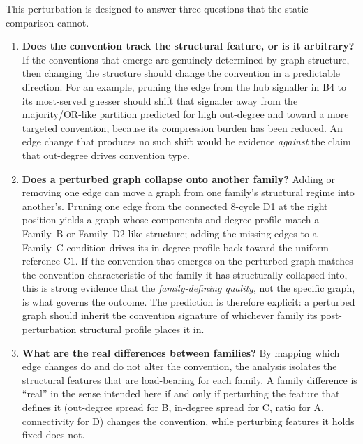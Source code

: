 \documentclass[a4paper,twoside,12pt]{report}
\begin{document}
    This perturbation is designed to answer three questions that the static
    comparison cannot.
    
    \begin{enumerate}
        \item \textbf{Does the convention track the structural feature, or is it
        arbitrary?} If the conventions that emerge are genuinely determined by
        graph structure, then changing the structure should change the convention
        in a predictable direction. For an example, pruning the edge from the hub signaller in B4 to
        its most-served guesser should shift that signaller away from the
        majority/OR-like partition predicted for high out-degree and toward a more
        targeted convention, because its compression burden has been reduced. An
        edge change that produces no such shift would be evidence \emph{against}
        the claim that out-degree drives convention type.
    
        \item \textbf{Does a perturbed graph collapse onto another family?} Adding
        or removing one edge can move a graph from one family's structural regime
        into another's. Pruning one edge from the connected $8$-cycle D1 at the
        right position yields a graph whose components and degree profile match a
        Family~B or Family~D2-like structure; adding the missing edges to a
        Family~C condition drives its in-degree profile back toward the uniform
        reference C1. If the convention that emerges on the perturbed graph
        matches the convention characteristic of the family it has structurally
        collapsed into, this is strong evidence that the \emph{family-defining
        quality}, not the specific graph, is what governs the outcome. The
        prediction is therefore explicit: a perturbed graph should inherit the
        convention signature of whichever family its post-perturbation structural
        profile places it in.
    
        \item \textbf{What are the real differences between families?} By mapping
        which edge changes do and do not alter the convention, the analysis
        isolates the structural features that are load-bearing for each family.
        A family difference is ``real'' in the sense intended here if and only if
        perturbing the feature that defines it (out-degree spread for B, in-degree
        spread for C, ratio for A, connectivity for D) changes the convention,
        while perturbing features it holds fixed does not.
    \end{enumerate}
    
\end{document}
